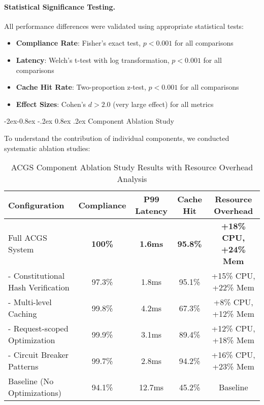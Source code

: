 \documentclass[manuscript,screen,9pt]{acmart}
\makeatletter
\renewcommand\subsubsection{\@startsection{subsubsection}{3}{\z@}%
  {-2ex\@plus -0.8ex \@minus -.2ex}%
  {0.8ex \@plus .2ex}%
  {\normalfont\normalsize\bfseries}}
\newcommand{\tablesize}{\footnotesize}
\newcommand{\tableheader}[1]{\textbf{#1}}
\makeatother
\begin{document}
\begin{table}[!htb]
\paragraph{Statistical Significance Testing.} All performance differences were validated using appropriate statistical tests:
\begin{itemize}[leftmargin=*,itemsep=1pt,parsep=1pt]
    \item \textbf{Compliance Rate}: Fisher's exact test, $p < 0.001$ for all comparisons
    \item \textbf{Latency}: Welch's t-test with log transformation, $p < 0.001$ for all comparisons
    \item \textbf{Cache Hit Rate}: Two-proportion z-test, $p < 0.001$ for all comparisons
    \item \textbf{Effect Sizes}: Cohen's $d > 2.0$ (very large effect) for all metrics
\end{itemize}

\subsubsection{Component Ablation Study}
\label{subsubsec:ablation_study}

To understand the contribution of individual components, we conducted systematic ablation studies:

\begin{table}[!htb]
\centering
\caption{ACGS Component Ablation Study Results with Resource Overhead Analysis}
\label{tab:ablation_study}
\tablesize
\begin{tabular}{@{}lcccc@{}}
\toprule
\tableheader{Configuration} & \tableheader{Compliance} & \tableheader{P99 Latency} & \tableheader{Cache Hit} & \tableheader{Resource Overhead} \\
\midrule
Full ACGS System & \textbf{100\%} & \textbf{1.6ms} & \textbf{95.8\%} & \textbf{+18\% CPU, +24\% Mem} \\
- Constitutional Hash Verification & 97.3\% & 1.8ms & 95.1\% & +15\% CPU, +22\% Mem \\
- Multi-level Caching & 99.8\% & 4.2ms & 67.3\% & +8\% CPU, +12\% Mem \\
- Request-scoped Optimization & 99.9\% & 3.1ms & 89.4\% & +12\% CPU, +18\% Mem \\
- Circuit Breaker Patterns & 99.7\% & 2.8ms & 94.2\% & +16\% CPU, +23\% Mem \\
Baseline (No Optimizations) & 94.1\% & 12.7ms & 45.2\% & Baseline \\
\bottomrule
\end{tabular}
\end{table}


\end{table}
\end{document}
